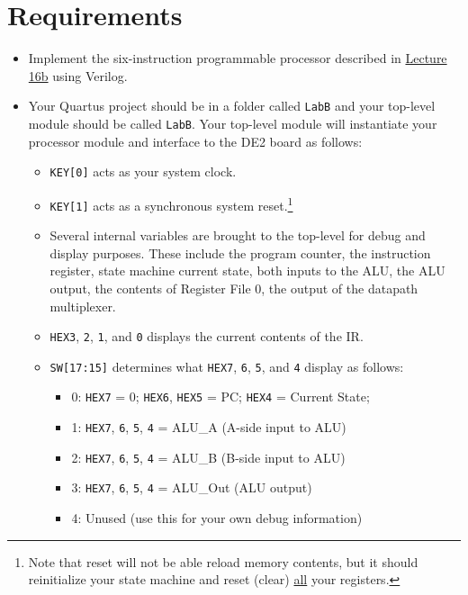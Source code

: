 \section{Requirements} \label{sec:requirements}

\begin{itemize}
    \item Implement the six-instruction programmable processor described in
    \href{https://moodle.insttech.washington.edu/mod/resource/view.php?id=32929}{Lecture 16b} using Verilog.
    \item Your Quartus project should be in a folder called \verb|LabB| and your top-level module should be called \verb|LabB|.
    Your top-level module will instantiate your processor module and interface to the DE2 board as follows:
    \begin{itemize}
        \item \verb|KEY[0]| acts as your system clock.
        \item \verb|KEY[1]| acts as a synchronous system reset.\footnote{%
            Note that reset will not be able reload memory contents,
            but it should reinitialize your state machine and reset (clear) \underline{all} your registers.
        }
        \item Several internal variables are brought to the top-level for debug and display purposes.
        These include the program counter, the instruction register, state machine current state,
        both inputs to the ALU, the ALU output, the contents of Register File 0, the output of the datapath multiplexer.
        \item \verb|HEX3|, \verb|2|, \verb|1|, and \verb|0| displays the current contents of the IR.
        \item \verb|SW[17:15]| determines what \verb|HEX7|, \verb|6|, \verb|5|, and \verb|4| display as follows:
        \begin{itemize}
            \item 0: \verb|HEX7| = 0; \verb|HEX6|, \verb|HEX5| = PC; \verb|HEX4| = Current State;
            \item 1: \verb|HEX7|, \verb|6|, \verb|5|, \verb|4| = ALU\_A (A-side input to ALU)
            \item 2: \verb|HEX7|, \verb|6|, \verb|5|, \verb|4| = ALU\_B (B-side input to ALU)
            \item 3: \verb|HEX7|, \verb|6|, \verb|5|, \verb|4| = ALU\_Out (ALU output)
            \item 4: Unused (use this for your own debug information)

\end{itemize}
\end{itemize}
\end{itemize}

